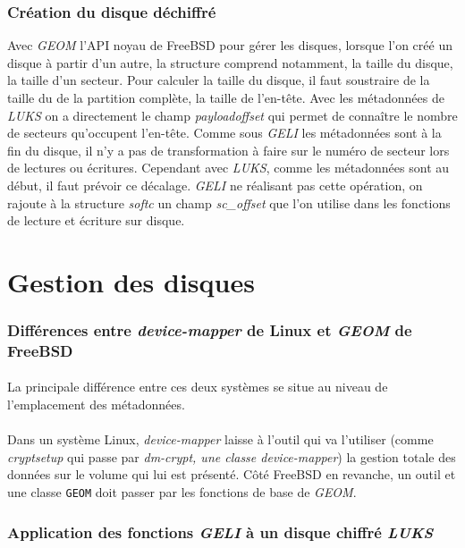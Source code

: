 \subsubsection{Création du disque déchiffré}
Avec {\em GEOM} l'API noyau de FreeBSD pour gérer les disques, lorsque l'on
créé un disque à partir d'un autre, la structure comprend notamment, la taille
du disque, la taille d'un secteur. Pour calculer la taille du disque, il faut
soustraire de la taille du de la partition complète, la taille de l'en-tête. 
Avec les métadonnées de {\em LUKS} on a directement le champ {\em payloadoffset}
qui permet de connaître le nombre de secteurs qu'occupent l'en-tête. Comme sous
{\em GELI} les métadonnées sont à la fin du disque, il n'y a pas de
transformation à faire sur le numéro de secteur lors de lectures ou écritures.
Cependant avec {\em LUKS}, comme les métadonnées sont au début, il faut prévoir
ce décalage. {\em GELI} ne réalisant pas cette opération, on rajoute
à la structure {\em softc} un champ {\em sc\_offset} que l'on utilise dans les
fonctions de lecture et écriture sur disque.


\section{Gestion des disques}

\subsubsection{Différences entre \textit{device-mapper} de Linux et
  \textit{GEOM} de FreeBSD}
\paragraph{}
La principale différence entre ces deux systèmes se situe au niveau de
l'emplacement des métadonnées.
\paragraph{}
Dans un système Linux, \textit{device-mapper} laisse à l'outil qui va l'utiliser
(comme \textit{cryptsetup} qui passe par \textit{dm-crypt, une classe
  \textit{device-mapper}}) la gestion totale des données sur le volume qui lui
est présenté. Côté FreeBSD en revanche, un outil et une classe \texttt{GEOM}
doit passer par les fonctions de base de \textit{GEOM}.

\subsubsection{Application des fonctions \textit{GELI} à un disque chiffré \textit{LUKS}}
